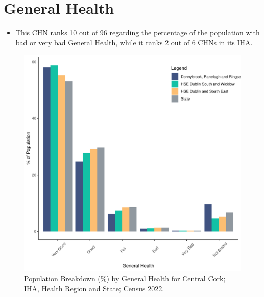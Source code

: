 \documentclass{article}
\begin{document}
\pagebreak

\section{General Health}\label{sect:GenHealth}
\begin{itemize}
\item  This CHN ranks  10 out of 96 regarding the percentage of the population with bad or very bad General Health, while it ranks   2 out of 6 CHNs in its IHA.
\end{itemize}
\begin{figure}[h]
	\centering
	\includegraphics[width = 150mm]{../figures/GenED.pdf}
	\caption{Population Breakdown (\%) by General Health for Central Cork; IHA, Health Region and State;  Census 2022.}
	\label{fig:2ae19629-1a6a-13a3-e055-000000000001}
	\end{figure}
\end{document}
